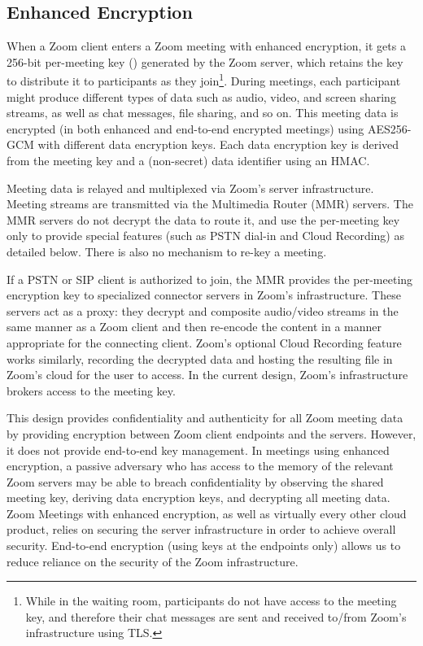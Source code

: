 \subsection{Enhanced Encryption}
\label{subsec:enhancedmeetings}
When a Zoom client enters a Zoom meeting with enhanced encryption, it gets a 256-bit per-meeting key
(\MK) generated by the Zoom server, which retains the key to distribute it to participants as they
join\footnote{While in the waiting room, participants do not have access to the meeting key, and
therefore their chat messages are sent and received to/from Zoom's infrastructure using TLS.}. During meetings, each participant
might produce different types of data such as audio, video, and screen sharing streams, as well as chat
messages, file sharing, and so on. This meeting data is encrypted (in both enhanced and end-to-end
encrypted meetings) using AES256-GCM with different data encryption keys. Each
data encryption key is derived from the meeting key and a (non-secret) data
identifier using an HMAC.

Meeting data is relayed and multiplexed via Zoom's server infrastructure. Meeting streams are
transmitted via the Multimedia Router (MMR) servers. The MMR servers do not decrypt the data to
route it, and use the per-meeting key only to provide special features (such as PSTN dial-in and
Cloud Recording) as detailed below. There is also no mechanism to re-key a meeting.


If a PSTN or SIP client is authorized to join, the MMR provides the per-meeting encryption key to
specialized connector servers in Zoom's infrastructure. These servers act as a proxy: they decrypt
and composite audio/video streams in the same manner as a Zoom client and then re-encode the
content in a manner appropriate for the connecting client. Zoom's optional Cloud Recording feature
works similarly, recording the decrypted data and hosting the resulting file in Zoom's cloud for
the user to access. In the current design, Zoom's infrastructure brokers access to the meeting key.

This design provides confidentiality and authenticity for all Zoom meeting data by providing
encryption between Zoom client endpoints and the servers. However, it does not provide end-to-end
key management. In meetings using enhanced encryption, a passive adversary who has access to the
memory of the relevant Zoom servers may be able to breach confidentiality by observing the shared
meeting key, deriving data encryption keys, and decrypting all meeting data. Zoom Meetings with
enhanced encryption, as well as virtually every other cloud product, relies on securing the server
infrastructure in order to achieve overall security. End-to-end encryption (using keys at the
endpoints only) allows us to reduce reliance on the security of the Zoom infrastructure.


